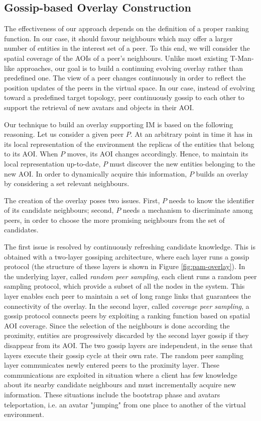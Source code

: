 \documentclass[final,10pt,a5paper]{phdimt}
\theoremstyle{definition}
\begin{document}
\subsection{Gossip-based Overlay Construction}

The effectiveness of our approach depends on the definition of a proper ranking function. In our case,
it should favour neighbours which may offer a larger number of entities in the interest set of a peer. To this end,
we will consider the spatial coverage of the AOIs of a peer's neighbours.
Unlike most existing T-Man-like approaches, our goal is to build a continuing evolving overlay rather than predefined one. The view of a peer changes continuously in order to reflect the position updates of the peers in the virtual space. In our case, instead of evolving toward a predefined target topology, peer continuously gossip to each other to support the retrieval of new avatars and objects in their AOI.


Our technique to build an overlay supporting IM is based on the following reasoning. 
Let us consider a given peer $P$.
At an arbitrary point in time it has in its local representation of the environment the replicas of the entities that belong to its AOI. 
When $P$ moves, its AOI changes accordingly.
Hence, to maintain its local representation up-to-date, $P$ must discover the new entities belonging to the new AOI.
In order to dynamically acquire this information, $P$ builds an overlay by considering a set relevant neighbours. 

The creation of the overlay poses two issues.
First, $P$ needs to know the identifier of its candidate neighbours; 
second, $P$ needs a mechanism to discriminate among peers, in order to choose the more
promising neighbours from the set of candidates.

The first issue is resolved by continuously refreshing candidate knowledge.
This is obtained with a two-layer gossiping architecture, where each layer runs a gossip protocol (the structure of these layers is shown in Figure \ref{fig:pam-overlay}).
In the underlying layer, called \textit{random peer sampling}, each client runs a random peer sampling protocol, which provide a subset of all the nodes in the system.
This layer enables each peer to maintain a set of long range links that guarantees the connectivity of the overlay.
In the second layer, called \textit{coverage peer sampling}, a gossip protocol connects peers by exploiting a ranking function based on spatial AOI coverage. 
Since the selection of the neighbours is done according the proximity, entities are progressively discarded by the second layer gossip if they disappear from its AOI. 
The two gossip layers are independent, in the sense that layers execute their gossip cycle at their own rate.
The random peer sampling layer communicates newly entered peers to the proximity layer. 
These communications are exploited in situation where a client has few knowledge about its nearby candidate
neighbours and must incrementally acquire new information.
These situations include the bootstrap phase and avatars teleportation, i.e. an avatar "jumping" from one place to another of the virtual environment.
\end{document}

